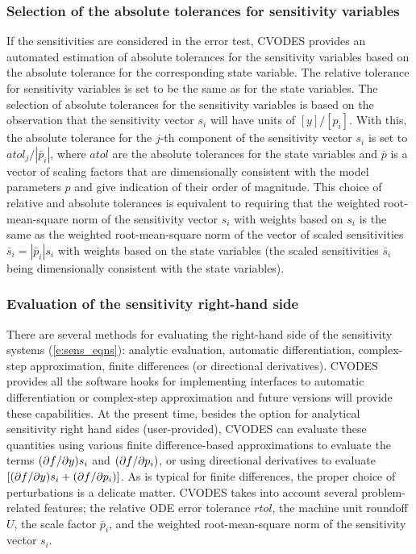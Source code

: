 \subsubsection{Selection of the absolute tolerances for sensitivity variables}
If the sensitivities are considered in the error test, CVODES provides an 
automated estimation of absolute tolerances for the sensitivity variables 
based on the absolute tolerance for the corresponding state variable.
The relative tolerance for sensitivity variables is set to be the same as for 
the state variables. The selection of absolute tolerances for the sensitivity 
variables is based on the observation that the sensitivity vector $s_i$ will have 
units of $[y]/[p_i]$.
With this, the absolute tolerance for the $j$-th component of the sensitivity
vector $s_i$ is set to ${atol_j}/{|{\bar p}_i|}$,
where $atol$ are the absolute tolerances for the state variables and $\bar p$
is a vector of scaling factors that are dimensionally consistent with
the model parameters $p$ and give indication of their order of magnitude.
This choice of relative and absolute tolerances is equivalent 
to requiring that the weighted root-mean-square norm of the sensitivity 
vector $s_i$ with weights based on $s_i$ is the same as the
weighted root-mean-square norm of the vector of scaled sensitivities 
${\bar s}_i = |{\bar p}_i| s_i$ with weights based on the state variables
(the scaled sensitivities ${\bar s}_i$ being dimensionally consistent with the
state variables).

\subsubsection{Evaluation of the sensitivity right-hand side}
There are several methods for evaluating the right-hand side of the sensitivity 
systems (\ref{e:sens_eqns}): analytic evaluation, automatic differentiation, 
complex-step approximation, finite differences (or directional derivatives).
CVODES provides all the software hooks for implementing interfaces to
automatic differentiation or complex-step approximation and future versions
will provide these capabilities.
At the present time, besides the option for analytical sensitivity right hand 
sides (user-provided), CVODES can evaluate these quantities using various
finite difference-based approximations to evaluate the terms $(\partial f / \partial y) s_i$ 
and $(\partial f / \partial p_i)$, or using directional derivatives to evaluate
$\left[ (\partial f / \partial y) s_i + (\partial f / \partial p_i) \right]$.
As is typical for finite differences, the proper choice of perturbations is a 
delicate matter. CVODES takes into account several problem-related features;
the relative ODE error tolerance $rtol$, the machine unit roundoff $U$,
the scale factor ${\bar p}_i$, and the weighted root-mean-square norm of the 
sensitivity vector $s_i$.

